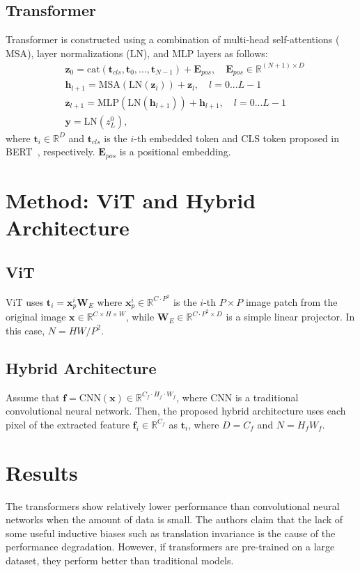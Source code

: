 \documentclass[10pt,twocolumn,letterpaper]{article}
\begin{document}
\subsection{Transformer}
Transformer is constructed using a combination of multi-head self-attentions ($\text{MSA}$), layer normalizations ($\text{LN}$), and MLP layers as follows:
\begin{align*}
	&\mathbf{z}_0 = \text{cat}(\mathbf{t}_{cls}, \mathbf{t}_0, ..., \mathbf{t}_{N-1}) + \mathbf{E}_{pos}, \quad \mathbf{E}_{pos} \in \mathbb{R}^{(N + 1) \times D} \\
	&\mathbf{h}_{l+1} = \text{MSA}(\text{LN}(\mathbf{z}_{l})) + \mathbf{z}_{l}, \quad l = 0 \text{...} L-1 \\
	&\mathbf{z}_{l+1} = \text{MLP}(\text{LN}(\mathbf{h}_{l + 1})) + \mathbf{h}_{l+1}, \quad l = 0 \text{...} L-1 \\
	&\mathbf{y} = \text{LN}(z^0_{L}),
\end{align*}
where $\mathbf{t}_i \in \mathbb{R}^D$ and $\mathbf{t}_{cls}$ is the $i$-th embedded token and $\text{CLS}$ token proposed in BERT~\cite{BERT}, respectively. $\mathbf{E}_{pos}$ is a positional embedding.

\section{Method: ViT and Hybrid Architecture}
\subsection{ViT}
ViT uses $\mathbf{t}_i = \mathbf{x}^i_p\mathbf{W}_{E}$ where $\mathbf{x}^i_p \in \mathbb{R}^{C \cdot P^2}$ is the $i$-th $P \times P$ image patch from the original image $\mathbf{x} \in \mathbb{R}^{C \times H \times W}$, while $\mathbf{W}_{E} \in \mathbb{R} ^ {C \cdot P^2 \times D}$ is a simple linear projector. In this case, $N = HW / P^2$.

\subsection{Hybrid Architecture}
Assume that $\mathbf{f} = \text{CNN}(\mathbf{x}) \in \mathbb{R} ^ {C_f \cdot H_f \cdot W_f}$, where $\text{CNN}$ is a traditional convolutional neural network. Then, the proposed hybrid architecture uses each pixel of the extracted feature $\mathbf{f}_i \in \mathbb{R}^{C_f}$ as $\mathbf{t}_i$, where $D = C_f$ and $N = H_fW_f$.

\section{Results}
The transformers show relatively lower performance than convolutional neural networks when the amount of data is small. The authors claim that the lack of some useful inductive biases such as translation invariance is the cause of the performance degradation. However, if transformers are pre-trained on a large dataset, they perform better than traditional models. 
\end{document}
